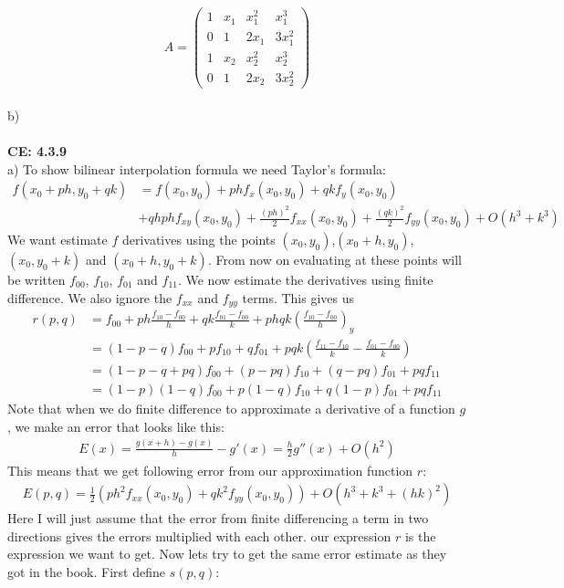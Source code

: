 \documentclass[11pt,a4paper]{report}
\begin{document}
$$ 
A = 
 \begin{pmatrix}
  1 & x_1 & x_1^2 &  x_1^3 \\
  0 & 1 & 2x_1 & 3x_1^2 \\
  1 & x_2 & x_2^2  & x_2^3  \\
  0 & 1 & 2x_2  & 3x_2^2 
 \end{pmatrix}
$$
\\
b)
\\
\\
\textbf{CE: 4.3.9}
\\
a) To show bilinear interpolation formula we need Taylor's formula:
\begin{align*}
f(x_0+ph,y_0+qk)&= f(x_0,y_0) + phf_x(x_0,y_0)+qkf_y(x_0,y_0)\\
&+qhphf_{xy}(x_0,y_0)+\frac{(ph)^2}{2}f_{xx}(x_0,y_0)+\frac{(qk)^2}{2}f_{yy}(x_0,y_0) +O(h^3+k^3)
\end{align*}
We want estimate $f$ derivatives using the points $(x_0,y_0)$,$(x_0+h,y_0)$,$(x_0,y_0+k)$ and $(x_0+h,y_0+k)$. From now on evaluating at these points will be written $f_{00}$, $f_{10}$, $f_{01}$ and $f_{11}$. We now estimate the derivatives using finite difference. We also ignore the $f_{xx}$ and $f_{yy}$ terms. This gives us 
\begin{align*}
r(p,q)&=f_{00} +ph\frac{f_{10}-f_{00}}{h}+qk\frac{f_{01}-f_{00}}{k} +phqk(\frac{f_{10}-f_{00}}{h})_y \\
&=(1-p-q)f_{00} + pf_{10}+qf_{01} +pqk(\frac{f_{11}-f_{10}}{k}-\frac{f_{01}-f_{00}}{k}) \\
&= (1-p-q+pq)f_{00} +(p-pq)f_{10}+(q-pq)f_{01}+ pqf_{11} \\
&=(1-p)(1-q)f_{00}+p(1-q)f_{10}+q(1-p)f_{01}+ pqf_{11}
\end{align*} 
Note that when we do finite difference to approximate a derivative of a function $g$, we make an error that looks like this:
\begin{align*}
E(x)=\frac{g(x+h)-g(x)}{h}-g'(x) = \frac{h}{2}g''(x) + O(h^2)
\end{align*} 
This means that we get following error from our approximation function $r$:
\begin{align*}
E(p,q) = \frac{1}{2}(ph^2f_{xx}(x_0,y_0)+qk^2f_{yy}(x_0,y_0)) +O(h^3+k^3+(hk)^2) 
\end{align*}
Here I will just assume that the error from finite differencing a term in two directions gives the errors multiplied with each other. our expression $r$ is the expression we want to get. Now lets try to get the same error estimate as they got in the book. First define $s(p,q)$:
\end{document}
